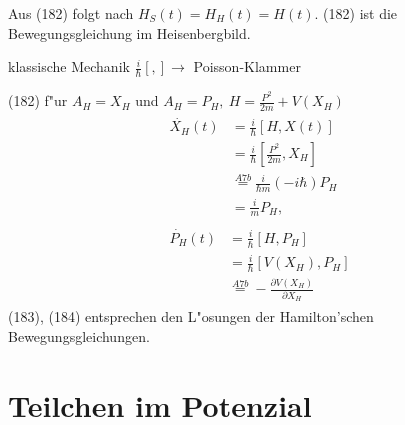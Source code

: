 \documentclass[a4paper]{scrartcl}
\begin{document}
{Aus (182) folgt nach $H_S(t) = H_H(t) = H(t)$. (182) ist die Bewegungsgleichung im Heisenbergbild.

klassische Mechanik $\frac i \hbar [,] \rightarrow $ Poisson-Klammer

(182) f"ur $A_H = X_H$ und $A_H = P_H, \ H = \frac {P^2}{2m} + V(X_H)$
\begin{align}
\begin{split}
\dot{X_H}(t) & = \frac i \hbar \left[ H, X(t) \right] \\
& = \frac i \hbar \left[ \frac {P^2}{2m}, X_H \right] \\
& \stackrel{A7b}= \frac i {\hbar m } (-i \hbar) P_H \\
& = \frac i m P_H,
\end{split} \\
\begin{split}
\dot{ P_H}(t) & = \frac i \hbar \left[ H, P_H \right] \\
& = \frac i \hbar \left[ V(X_H), P_H \right] \\
& \stackrel{A7b}= - \frac{ \partial V(X_H)}{\partial X_H}
\end{split}
\end{align}
(183), (184) entsprechen den L"osungen der Hamilton'schen Bewegungsgleichungen.

\section{Teilchen im Potenzial}

}
\end{document}
